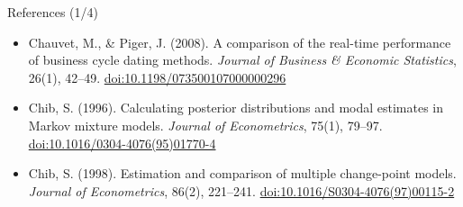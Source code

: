 \begin{frame}{References (1/4)}
\begin{itemize}
    \item Chauvet, M., \& Piger, J. (2008). A comparison of the real-time performance of business cycle dating methods. \textit{Journal of Business \& Economic Statistics}, 26(1), 42--49. \href{https://doi.org/10.1198/073500107000000296}{doi:10.1198/073500107000000296}
    \item Chib, S. (1996). Calculating posterior distributions and modal estimates in Markov mixture models. \textit{Journal of Econometrics}, 75(1), 79--97. \href{https://doi.org/10.1016/0304-4076(95)01770-4}{doi:10.1016/0304-4076(95)01770-4}
    \item Chib, S. (1998). Estimation and comparison of multiple change-point models. \textit{Journal of Econometrics}, 86(2), 221--241. \href{https://doi.org/10.1016/S0304-4076(97)00115-2}{doi:10.1016/S0304-4076(97)00115-2}
\end{itemize}
\end{frame}

